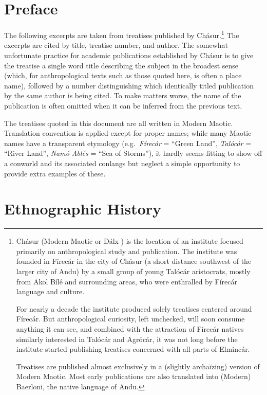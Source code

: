 \documentclass{article}
\begin{document}
\color{DarkGreen}

\section*{Preface}

The following excerpts are taken from treatises published by Chásur.\footnote{\color{DarkGreen} Chásur (Modern Maotic  or Dálx ) is the location of an institute focused primarily on anthropological study and publication. The institute was founded in Fírecár in the city of Chásur (a short distance southwest of the larger city of Andu) by a small group of young Talócár aristocrats, mostly from Akol Bílé and surrounding areas, who were enthralled by Fírecár language and culture. \par For nearly a decade the institute produced solely treatises centered around Fírecár. But anthropological curiosity, left unchecked, will soon consume anything it can see, and combined with the attraction of Fírecár natives similarly interested in Talócár and Agrócár, it was not long before the institute started publishing treatises concerned with all parts of Elmincár. \par Treatises are published almost exclusively in a (slightly archaïzing) version of Modern Maotic. Most early publications are also translated into (Modern) Baerloni, the native language of Andu.} The excerpts are cited by title, treatise number, and author. The somewhat unfortunate practice for academic publications established by Chásur is to give the treatise a single word title describing the subject in the broadest sense (which, for anthropological texts such as those quoted here, is often a place name), followed by a number distinguishing which identically titled publication by the same author is being cited. To make matters worse, the name of the publication is often omitted when it can be inferred from the previous text.

The treatises quoted in this document are all written in Modern Maotic. Translation convention is applied except for proper names; while many Maotic names have a transparent etymology (e.g.\ \textit{Fírecár} = ``Green Land'', \textit{Talócár} = ``River Land'', \textit{Namó Ablés} = ``Sea of Storms''), it hardly seems fitting to show off a conworld and its associated conlangs but neglect a simple opportunity to provide extra examples of these.

\color{DarkGreen}
\section*{Ethnographic History}
\end{document}
